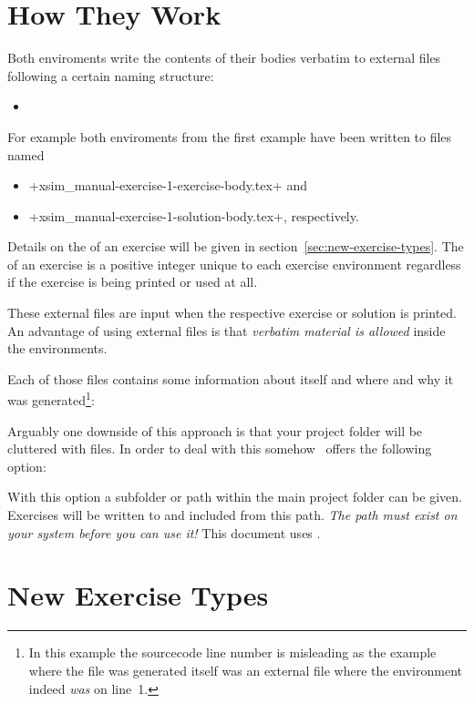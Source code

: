 \documentclass[load-preamble+]{cnltx-doc}
\begin{document}
\section{How They Work}
Both enviroments write the contents of their bodies verbatim to external files
following a certain naming structure:
\begin{itemize}
  \item
\end{itemize}
For example both enviroments from the first example have been written to files
named
\begin{itemize}
  \item \verbcode+xsim_manual-exercise-1-exercise-body.tex+ and
  \item \verbcode+xsim_manual-exercise-1-solution-body.tex+, respectively.
\end{itemize}
Details on the  of an exercise will be given in
section~\vref{sec:new-exercise-types}. The  of an exercise is a
positive integer unique to each exercise environment regardless if the
exercise is being printed or used at all.

These external files are input when the respective exercise or solution is
printed.  An advantage of using external files is that \emph{verbatim material
  is allowed} inside the environments.

Each of those files contains some information about itself and where and why
it was generated\footnote{In this example the sourcecode line number is
  misleading as the example where the file was generated itself was an
  external file where the  environment indeed \emph{was} on
  line~1.}:


Arguably one downside of this approach is that your project folder will be
cluttered with files.  In order to deal with this somehow \xsim\ offers the
following option:
\begin{options}
  \Default
    With this option a subfolder or path within the main project folder can be
    given.  Exercises will be written to and included from this path.
    \emph{The path must exist on your system before you can use it!} This
    document uses .
\end{options}

\section{New Exercise Types}\label{sec:new-exercise-types}
\end{document}
